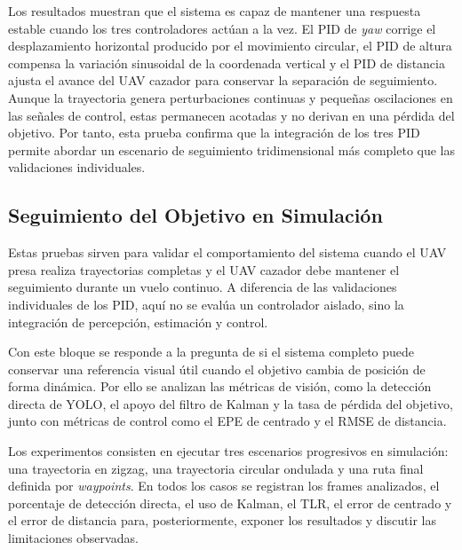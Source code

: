 \vspace{0.3cm}

Los resultados muestran que el sistema es capaz de mantener una respuesta estable cuando los tres controladores actúan a la vez. El PID de \textit{yaw} corrige el desplazamiento horizontal producido por el movimiento circular, el PID de altura compensa la variación sinusoidal de la coordenada vertical y el PID de distancia ajusta el avance del UAV cazador para conservar la separación de seguimiento. Aunque la trayectoria genera perturbaciones continuas y pequeñas oscilaciones en las señales de control, estas permanecen acotadas y no derivan en una pérdida del objetivo. Por tanto, esta prueba confirma que la integración de los tres PID permite abordar un escenario de seguimiento tridimensional más completo que las validaciones individuales.



\clearpage

\subsection{Seguimiento del Objetivo en Simulación}

Estas pruebas sirven para validar el comportamiento del sistema cuando el UAV presa realiza trayectorias completas y el UAV cazador debe mantener el seguimiento durante un vuelo continuo. A diferencia de las validaciones individuales de los PID, aquí no se evalúa un controlador aislado, sino la integración de percepción, estimación y control.

\vspace{0.3cm}

Con este bloque se responde a la pregunta de si el sistema completo puede conservar una referencia visual útil cuando el objetivo cambia de posición de forma dinámica. Por ello se analizan las métricas de visión, como la detección directa de YOLO, el apoyo del filtro de Kalman y la tasa de pérdida del objetivo, junto con métricas de control como el EPE de centrado y el RMSE de distancia.

\vspace{0.3cm}

Los experimentos consisten en ejecutar tres escenarios progresivos en simulación: una trayectoria en zigzag, una trayectoria circular ondulada y una ruta final definida por \textit{waypoints}. En todos los casos se registran los frames analizados, el porcentaje de detección directa, el uso de Kalman, el TLR, el error de centrado y el error de distancia para, posteriormente, exponer los resultados y discutir las limitaciones observadas.

